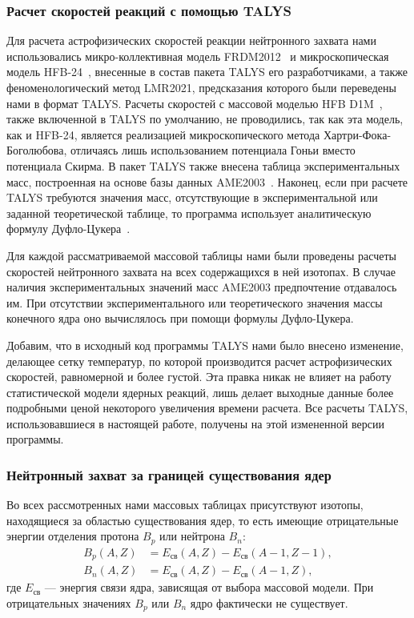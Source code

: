 \subsubsection{Расчет скоростей реакций с помощью TALYS}
Для расчета астрофизических скоростей реакции нейтронного захвата нами использовались микро-коллективная модель FRDM2012~\cite{moller2016} и микроскопическая модель HFB-24~\cite{goriely2013}, внесенные в состав пакета TALYS его разработчиками, а также феноменологический метод LMR2021, предсказания которого были переведены нами в формат TALYS. Расчеты скоростей с массовой моделью HFB D1M~\cite{goriely2009}, также включенной в TALYS по умолчанию, не проводились, так как эта модель, как и HFB-24, является реализацией микроскопического метода Хартри-Фока-Боголюбова, отличаясь лишь использованием потенциала Гоньи вместо потенциала Скирма. В пакет TALYS также внесена таблица экспериментальных масс, построенная на основе базы данных AME2003~\cite{wapstra2003}. Наконец, если при расчете TALYS требуются значения масс, отсутствующие в экспериментальной или заданной теоретической таблице, то программа использует аналитическую формулу Дуфло-Цукера~\cite{duflo1995}.

Для каждой рассматриваемой массовой таблицы нами были проведены расчеты скоростей нейтронного захвата на всех содержащихся в ней изотопах. В случае наличия экспериментальных значений масс AME2003 предпочтение отдавалось им. При отсутствии экспериментального или теоретического значения массы конечного ядра оно вычислялось при помощи формулы Дуфло-Цукера. 

Добавим, что в исходный код программы TALYS нами было внесено изменение, делающее сетку температур, по которой производится расчет астрофизических скоростей, равномерной и более густой. Эта правка никак не влияет на работу статистической модели ядерных реакций, лишь делает выходные данные более подробными ценой некоторого увеличения времени расчета. Все расчеты TALYS, использовавшиеся в настоящей работе, получены на этой измененной версии программы.  


\subsubsection{Нейтронный захват за границей существования ядер}
Во всех рассмотренных нами массовых таблицах присутствуют изотопы, находящиеся за областью существования ядер, то есть имеющие отрицательные энергии отделения протона $B_p$ или нейтрона $B_n$:
\begin{equation}\begin{aligned}\label{eq:driplines}
B_p(A,Z) &= E_{\text{св}}(A,Z) - E_{\text{св}}(A-1,Z-1),\\
B_n(A,Z) &= E_{\text{св}}(A,Z) - E_{\text{св}}(A-1,Z),
\end{aligned}\end{equation}
где $E_{\text{св}}$ --- энергия связи ядра, зависящая от выбора массовой модели. При отрицательных значениях $B_p$ или $B_n$ ядро фактически не существует. 

